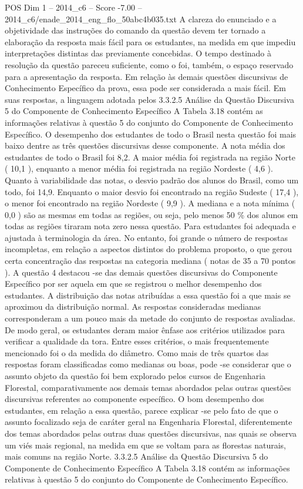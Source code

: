\begin{textsample}{POS Dim 1 – 2014\_c6 – Score -7.00 – 2014\_c6/enade\_2014\_eng\_flo\_50abc4b035.txt}
A clareza do enunciado e a objetividade das instruções do comando da questão devem ter tornado a elaboração da resposta mais fácil para os estudantes, na medida em que impediu interpretações distintas das previamente concebidas.
O tempo destinado à resolução da questão pareceu suficiente, como o foi, também, o espaço reservado para a apresentação da resposta.
Em relação às demais questões discursivas de Conhecimento Específico da prova, essa pode ser considerada a mais fácil.
Em suas respostas, a linguagem adotada pelos 3.3.2.5 Análise da Questão Discursiva 5 do Componente de Conhecimento Específico A Tabela 3.18 contém as informações relativas à questão 5 do conjunto do Componente de Conhecimento Específico.
O desempenho dos estudantes de todo o Brasil nesta questão foi mais baixo dentre as três questões discursivas desse componente.
A nota média dos estudantes de todo o Brasil foi 8,2.
A maior média foi registrada na região Norte ( 10,1 ), enquanto a menor média foi registrada na região Nordeste ( 4,6 ).
Quanto à variabilidade das notas, o desvio padrão dos alunos do Brasil, como um todo, foi 14,9.
Enquanto o maior desvio foi encontrado na região Sudeste ( 17,4 ), o menor foi encontrado na região Nordeste ( 9,9 ).
A mediana e a nota mínima ( 0,0 ) são as mesmas em todas as regiões, ou seja, pelo menos 50 \% dos alunos em todas as regiões tiraram nota zero nessa questão.
Para estudantes foi adequada e ajustada à terminologia da área.
No entanto, foi grande o número de respostas incompletas, em relação a aspectos distintos do problema proposto, o que gerou certa concentração das respostas na categoria mediana ( notas de 35 a 70 pontos ).
A questão 4 destacou -se das demais questões discursivas do Componente Específico por ser aquela em que se registrou o melhor desempenho dos estudantes.
A distribuição das notas atribuídas a essa questão foi a que mais se aproximou da distribuição normal.
As respostas consideradas medianas corresponderam a um pouco mais da metade do conjunto de respostas avaliadas.
De modo geral, os estudantes deram maior ênfase aos critérios utilizados para verificar a qualidade da tora.
Entre esses critérios, o mais frequentemente mencionado foi o da medida do diâmetro.
Como mais de três quartos das respostas foram classificadas como medianas ou boas, pode -se considerar que o assunto objeto da questão foi bem explorado pelos cursos de Engenharia Florestal, comparativamente aos demais temas abordados pelas outras questões discursivas referentes ao componente específico.
O bom desempenho dos estudantes, em relação a essa questão, parece explicar -se pelo fato de que o assunto focalizado seja de caráter geral na Engenharia Florestal, diferentemente dos temas abordados pelas outras duas questões discursivas, nas quais se observa um viés mais regional, na medida em que se voltam para as florestas naturais, mais comuns na região Norte. 3.3.2.5 Análise da Questão Discursiva 5 do Componente de Conhecimento Específico A Tabela 3.18 contém as informações relativas à questão 5 do conjunto do Componente de Conhecimento Específico.

\end{textsample}
